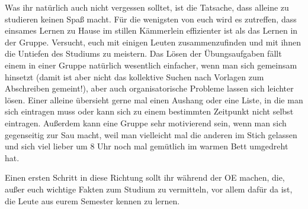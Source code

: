 Was ihr natürlich auch nicht vergessen solltet, ist die Tatsache, dass alleine
zu studieren keinen Spaß macht. Für die wenigsten von euch wird es zutreffen,
dass einsames Lernen zu Hause im stillen Kämmerlein effizienter ist als das
Lernen in der Gruppe. Versucht, euch mit einigen Leuten zusammenzufinden und
mit ihnen die Untiefen des Studiums zu meistern. Das Lösen der Übungsaufgaben
fällt einem in einer Gruppe natürlich wesentlich einfacher, wenn man sich
gemeinsam hinsetzt (damit ist aber nicht das kollektive Suchen nach Vorlagen
zum Abschreiben gemeint!), aber auch organisatorische Probleme lassen sich
leichter lösen. Einer alleine übersieht gerne mal einen Aushang oder eine
Liste, in die man sich eintragen muss oder kann sich zu einem bestimmten
Zeitpunkt nicht selbst eintragen. Außerdem kann eine Gruppe sehr motivierend
sein, wenn man sich gegenseitig zur Sau macht, weil man vielleicht mal die
anderen im Stich gelassen und sich viel lieber um 8 Uhr noch mal gemütlich im
warmen Bett umgedreht hat.


Einen ersten Schritt in diese Richtung sollt ihr während der OE machen, die,
außer euch wichtige Fakten zum Studium zu vermitteln, vor allem dafür da ist,
die Leute aus eurem Semester kennen zu lernen.
